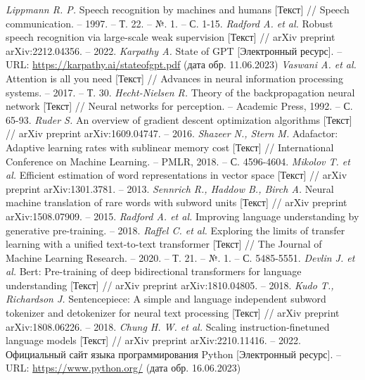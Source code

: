 \begin{thebibliography}{99}
  \textit{Lippmann R. P.} Speech recognition by machines and humans [Текст] // Speech communication. – 1997. – Т. 22. – №. 1. – С. 1-15.
  \textit{Radford A. et al.} Robust speech recognition via large-scale weak supervision [Текст] // arXiv preprint arXiv:2212.04356. – 2022.
  \textit{Karpathy A.} State of GPT [Электронный ресурс]. -- URL: \url{https://karpathy.ai/stateofgpt.pdf} (дата обр. 11.06.2023)
  \textit{Vaswani A. et al.} Attention is all you need [Текст] // Advances in neural information processing systems. – 2017. – Т. 30.
  \textit{Hecht-Nielsen R.} Theory of the backpropagation neural network [Текст] // Neural networks for perception. – Academic Press, 1992. – С. 65-93.
  \textit{Ruder S.} An overview of gradient descent optimization algorithms [Текст] // arXiv preprint arXiv:1609.04747. – 2016.
  \textit{Shazeer N., Stern M.} Adafactor: Adaptive learning rates with sublinear memory cost [Текст] // International Conference on Machine Learning. – PMLR, 2018. – С. 4596-4604.
  \textit{Mikolov T. et al.} Efficient estimation of word representations in vector space [Текст] // arXiv preprint arXiv:1301.3781. – 2013.
  \textit{Sennrich R., Haddow B., Birch A.} Neural machine translation of rare words with subword units [Текст] // arXiv preprint arXiv:1508.07909. – 2015.
  \textit{Radford A. et al.} Improving language understanding by generative pre-training. – 2018.
  \textit{Raffel C. et al.} Exploring the limits of transfer learning with a unified text-to-text transformer [Текст] // The Journal of Machine Learning Research. – 2020. – Т. 21. – №. 1. – С. 5485-5551.
  \textit{Devlin J. et al.} Bert: Pre-training of deep bidirectional transformers for language understanding [Текст] // arXiv preprint arXiv:1810.04805. – 2018.
  \textit{Kudo T., Richardson J.} Sentencepiece: A simple and language independent subword tokenizer and detokenizer for neural text processing [Текст] // arXiv preprint arXiv:1808.06226. – 2018.
  \textit{Chung H. W. et al.} Scaling instruction-finetuned language models [Текст] // arXiv preprint arXiv:2210.11416. – 2022.
  Официальный сайт языка программирования Python [Электронный ресурс]. -- URL: \url{https://www.python.org/} (дата обр. 16.06.2023)

\end{thebibliography}

